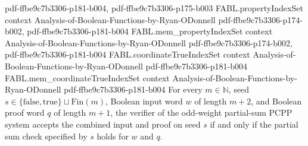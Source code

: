 \begin{theorem}
  {pdf-ffbe9c7b3306-p181-b004,
    pdf-ffbe9c7b3306-p175-b003}
\proofstep
  {FABL.propertyIndexSet}
  {context}
  {Analysis-of-Boolean-Functions-by-Ryan-ODonnell}
  {pdf-ffbe9c7b3306-p174-b002,
    pdf-ffbe9c7b3306-p181-b004}
\proofstep
  {FABL.mem_propertyIndexSet}
  {context}
  {Analysis-of-Boolean-Functions-by-Ryan-ODonnell}
  {pdf-ffbe9c7b3306-p174-b002,
    pdf-ffbe9c7b3306-p181-b004}
\proofstep
  {FABL.coordinateTrueIndexSet}
  {context}
  {Analysis-of-Boolean-Functions-by-Ryan-ODonnell}
  {pdf-ffbe9c7b3306-p181-b004}
\proofstep
  {FABL.mem_coordinateTrueIndexSet}
  {context}
  {Analysis-of-Boolean-Functions-by-Ryan-ODonnell}
  {pdf-ffbe9c7b3306-p181-b004}
For every $m\in\mathbb{N}$, seed
$s\in\{\mathrm{false},\mathrm{true}\}\sqcup\mathrm{Fin}(m)$, Boolean input word $w$ of
length $m+2$, and Boolean proof word $q$ of length $m+1$, the verifier of the odd-weight
partial-sum PCPP system accepts the combined input and proof on seed $s$ if and only if
the partial sum check specified by $s$ holds for $w$ and $q$.
\end{theorem}

